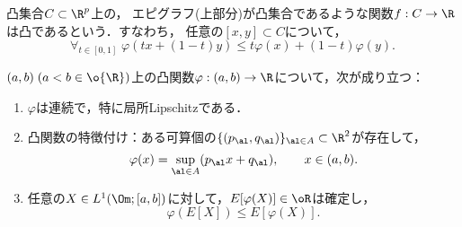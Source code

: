 \documentclass[uplatex,dvipdfmx]{jsreport}
\begin{document}
\begin{definition}
    凸集合$C\subset\R^p$上の，
    エピグラフ(上部分)が凸集合であるような関数$f:C\to\R$は凸であるという．すなわち，
    任意の$[x,y]\subset C$について，
    \[\forall_{t\in[0,1]}\;\varphi(tx+(1-t)y)\le t\varphi(x)+(1-t)\varphi(y).\]
\end{definition}

\begin{proposition}[Jensenの不等式の一般化]\label{prop-Jensen}
    $(a,b)\;(a<b\in\o{\R})$上の凸関数$\varphi:(a,b)\to\R$について，次が成り立つ：
    \begin{enumerate}
        \item $\varphi$は連続で，特に局所Lipschitzである．
        \item 凸関数の特徴付け：ある可算個の$\{(p_\al,q_\al)\}_{\al\in A}\subset\R^2$が存在して，
        \[\varphi(x)=\sup_{\al\in A}(p_\al x+q_\al),\qquad x\in(a,b).\]
        \item 任意の$X\in L^1(\Om;[a,b])$に対して，$E[\varphi(X)]\in\oR$は確定し，
        \[\varphi(E[X])\le E[\varphi(X)].\]
    \end{enumerate}
\end{proposition}
\end{document}

